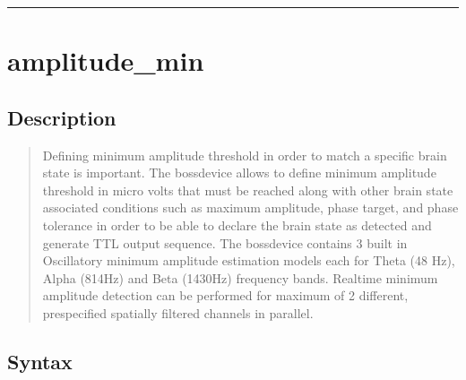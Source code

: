 \documentclass[letterpaper,10pt,english]{sphinxmanual}
\begin{document}
\bigskip\hrule\bigskip



\section{amplitude\_min}
\label{\detokenize{4_api_documentation:amplitude-min}}

\subsection{Description}
\label{\detokenize{4_api_documentation:id29}}\begin{quote}

\sphinxAtStartPar
Defining minimum amplitude threshold in order to match a specific brain state is important. The bossdevice allows to define minimum amplitude threshold in micro volts that must be reached along with other brain state associated conditions such as maximum amplitude, phase target, and phase tolerance in order to be able to declare the brain state as detected and generate TTL output sequence. The bossdevice contains 3 built in Oscillatory minimum amplitude estimation models each for Theta (4\sphinxhyphen{}8 Hz), Alpha (8\sphinxhyphen{}14Hz) and Beta (14\sphinxhyphen{}30Hz) frequency bands. Real\sphinxhyphen{}time minimum amplitude detection can be performed for maximum of 2 different, pre\sphinxhyphen{}specified spatially filtered channels in parallel.
\end{quote}


\subsection{Syntax}
\label{\detokenize{4_api_documentation:id30}}
\begin{sphinxVerbatim}[commandchars=\\\{\}]
\PYG{p}{[}\PYG{p}{]}
\PYG{p}{[}\PYG{p}{]}
\PYG{p}{[}\PYG{p}{]}
\end{sphinxVerbatim}
\end{document}
